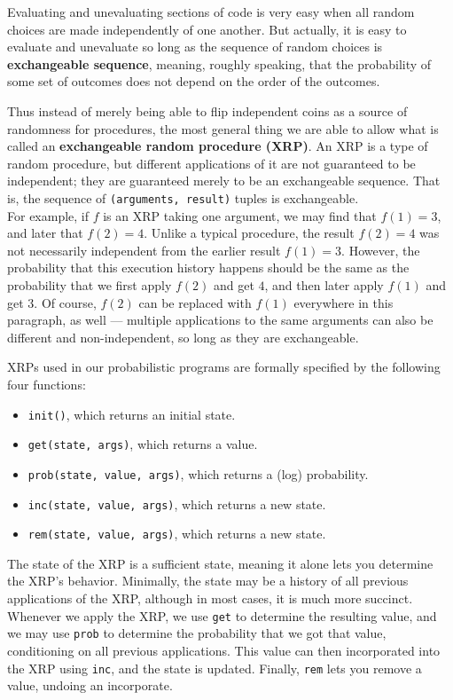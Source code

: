 \documentclass[10pt]{article}
\begin{document}
Evaluating and unevaluating sections of code is very easy when all random choices are made independently of one another.  But actually, it is easy to evaluate and unevaluate so long as the sequence of random choices is {\bf exchangeable sequence}, meaning, roughly speaking, that the probability of some set of outcomes does not depend on the order of the outcomes.  %

Thus instead of merely being able to flip independent coins as a source of randomness for procedures, the most general thing we are able to allow what is called an {\bf exchangeable random procedure (XRP)}.  An XRP is a type of random procedure, but different applications of it are not guaranteed to be independent; they are guaranteed merely to be an exchangeable sequence.  That is, the sequence of {\tt (arguments, result)} tuples is exchangeable.  \\

For example, if $f$ is an XRP taking one argument, we may find that $f(1) = 3$, and later that $f(2) = 4$.  Unlike a typical procedure, the result $f(2) = 4$ was not necessarily independent from the earlier result $f(1) = 3$.  However, the probability that this execution history happens should be the same as the probability that we first apply $f(2)$ and get $4$, and then later apply $f(1)$ and get $3$.  Of course, $f(2)$ can be replaced with $f(1)$ everywhere in this paragraph, as well --- multiple applications to the same arguments can also be different and non-independent, so long as they are exchangeable.

XRPs used in our probabilistic programs are formally specified by the following four functions:

\begin{itemize}
\item {\tt init()}, which returns an initial state.  
\item {\tt get(state, args)}, which returns a value.
\item {\tt prob(state, value, args)}, which returns a (log) probability.
\item {\tt inc(state, value, args)}, which returns a new state.
\item {\tt rem(state, value, args)}, which returns a new state.
\end{itemize}

The state of the XRP is a sufficient state, meaning it alone lets you determine the XRP's behavior.  Minimally, the state may be a history of all previous applications of the XRP, although in most cases, it is much more succinct.  Whenever we apply the XRP, we use {\tt get} to determine the resulting value, and we may use {\tt prob} to determine the probability that we got that value, conditioning on all previous applications.  This value can then incorporated into the XRP using {\tt inc}, and the state is updated.  Finally, {\tt rem} lets you remove a value, undoing an incorporate.
\end{document}
